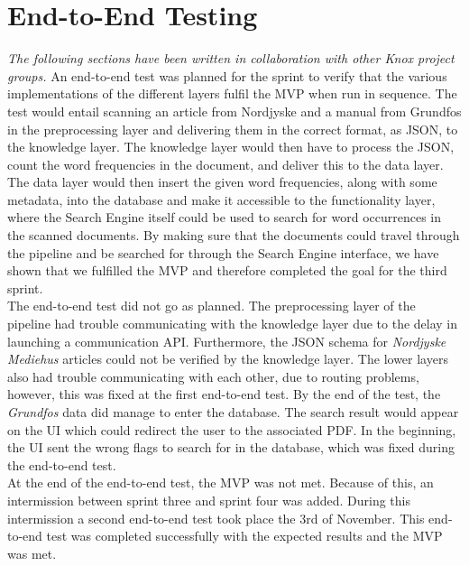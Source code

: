 \chapter{End-to-End Testing}\label{scrumofscrumendtotend}
\textit{The following sections have been written in collaboration with other Knox project groups.}
An end-to-end test was planned for the sprint to verify that the various implementations of the different layers fulfil the MVP when run in sequence. The test would entail scanning an article from Nordjyske and a manual from Grundfos in the preprocessing layer and delivering them in the correct format, as JSON, to the knowledge layer. The knowledge layer would then have to process the JSON, count the word frequencies in the document, and deliver this to the data layer. The data layer would then insert the given word frequencies, along with some metadata, into the database and make it accessible to the functionality layer, where the Search Engine itself could be used to search for word occurrences in the scanned documents.
By making sure that the documents could travel through the pipeline and be searched for through the Search Engine interface, we have shown that we fulfilled the MVP and therefore completed the goal for the third sprint.\\
The end-to-end test did not go as planned. The preprocessing layer of the pipeline had trouble communicating with the knowledge layer due to the delay in launching a communication API. Furthermore, the JSON schema for \textit{Nordjyske Mediehus} articles could not be verified by the knowledge layer.
The lower layers also had trouble communicating with each other, due to routing problems, however, this was fixed at the first end-to-end test. By the end of the test, the \textit{Grundfos} data did manage to enter the database. The search result would appear on the UI which could redirect the user to the associated PDF. In the beginning, the UI sent the wrong flags to search for in the database, which was fixed during the end-to-end test.\\
At the end of the end-to-end test, the MVP was not met. Because of this, an intermission between sprint three and sprint four was added. During this intermission a second end-to-end test took place the 3rd of November. This end-to-end test was completed successfully with the expected results and the MVP was met.